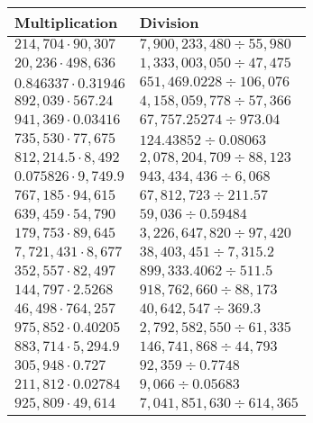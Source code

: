 \begin{longtable}[]{@{}ll@{}}
\toprule
Multiplication & Division\tabularnewline
\midrule
\endhead
\(214,704\cdot90,307\) & \(7,900,233,480÷55,980\)\tabularnewline
\(20,236\cdot498,636\) & \(1,333,003,050÷47,475\)\tabularnewline
\(0.846337\cdot0.31946\) & \(651,469.0228÷106,076\)\tabularnewline
\(892,039\cdot567.24\) & \(4,158,059,778÷57,366\)\tabularnewline
\(941,369\cdot0.03416\) & \(67,757.25274÷973.04\)\tabularnewline
\(735,530\cdot77,675\) & \(124.43852÷0.08063\)\tabularnewline
\(812,214.5\cdot8,492\) & \(2,078,204,709÷88,123\)\tabularnewline
\(0.075826\cdot9,749.9\) & \(943,434,436÷6,068\)\tabularnewline
\(767,185\cdot94,615\) & \(67,812,723÷211.57\)\tabularnewline
\(639,459\cdot54,790\) & \(59,036÷0.59484\)\tabularnewline
\(179,753\cdot89,645\) & \(3,226,647,820÷97,420\)\tabularnewline
\(7,721,431\cdot8,677\) & \(38,403,451÷7,315.2\)\tabularnewline
\(352,557\cdot82,497\) & \(899,333.4062÷511.5\)\tabularnewline
\(144,797\cdot2.5268\) & \(918,762,660÷88,173\)\tabularnewline
\(46,498\cdot764,257\) & \(40,642,547÷369.3\)\tabularnewline
\(975,852\cdot0.40205\) & \(2,792,582,550÷61,335\)\tabularnewline
\(883,714\cdot5,294.9\) & \(146,741,868÷44,793\)\tabularnewline
\(305,948\cdot0.727\) & \(92,359÷0.7748\)\tabularnewline
\(211,812\cdot0.02784\) & \(9,066÷0.05683\)\tabularnewline
\(925,809\cdot49,614\) & \(7,041,851,630÷614,365\)\tabularnewline
\bottomrule
\end{longtable}
